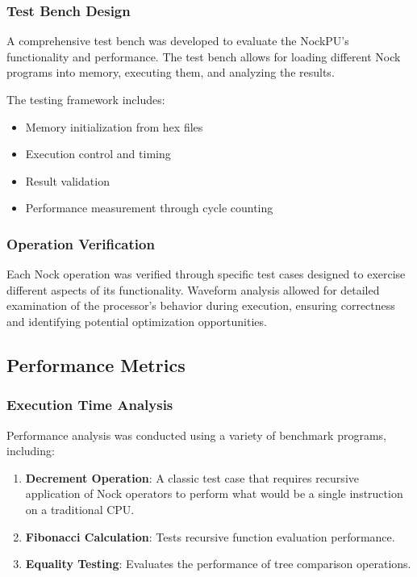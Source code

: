 \documentclass[twoside]{article}
\begin{document}
\subsubsection{Test Bench Design}

A comprehensive test bench was developed to evaluate the NockPU's functionality and performance. The test bench allows for loading different Nock programs into memory, executing them, and analyzing the results.

The testing framework includes:
\begin{itemize}
  \item Memory initialization from hex files
  \item Execution control and timing
  \item Result validation
  \item Performance measurement through cycle counting
\end{itemize}

\subsubsection{Operation Verification}

Each Nock operation was verified through specific test cases designed to exercise different aspects of its functionality. Waveform analysis allowed for detailed examination of the processor's behavior during execution, ensuring correctness and identifying potential optimization opportunities.

\subsection{Performance Metrics}

\subsubsection{Execution Time Analysis}

Performance analysis was conducted using a variety of benchmark programs, including:

\begin{enumerate}
  \item \textbf{Decrement Operation}: A classic test case that requires recursive application of Nock operators to perform what would be a single instruction on a traditional CPU.
  \item \textbf{Fibonacci Calculation}: Tests recursive function evaluation performance.
  \item \textbf{Equality Testing}: Evaluates the performance of tree comparison operations.
\end{enumerate}
\end{document}
